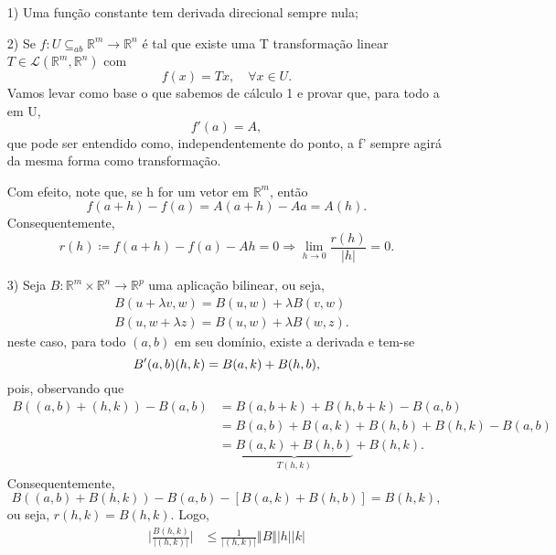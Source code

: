 \documentclass[../analysisII_notes.tex]{subfiles}
\begin{document}
\begin{example}
	\begin{itemize}
		\item[1)] Uma função constante tem derivada direcional sempre nula;
		\item[2)] Se \(f:U \subseteq_{ab} \mathbb{R}^{m}\rightarrow \mathbb{R}^{n}\) é tal que existe uma T transformação linear \(T\in \mathcal{L}(\mathbb{R}^{m}, \mathbb{R}^{n})\) com
		      \[
			      f(x) = Tx,\quad \forall x\in U.
		      \]
		      Vamos levar como base o que sabemos de cálculo 1 e provar que, para todo a em U,
		      \[
			      f'(a) = A,
		      \]
		      que pode ser entendido como, independentemente do ponto, a f' sempre agirá da mesma forma como transformação.

		      Com efeito, note que, se h for um vetor em \(\mathbb{R}^{m}\), então
		      \[
			      f(a+h) - f(a) = A(a+h) - Aa = A(h).
		      \]
		      Consequentemente,
		      \[
			      r(h)\coloneqq f(a+h) - f(a) - Ah = 0 \Rightarrow \lim_{h\to 0}\frac{r(h)}{|h|} = 0.
		      \]
		\item[3)] Seja \(B:\mathbb{R}^{m}\times \mathbb{R}^{n}\rightarrow \mathbb{R}^{p}\) uma aplicação bilinear, ou seja,
		      \begin{align*}
			       & B(u+\lambda v, w) = B(u, w) + \lambda B (v, w)  \\
			       & B(u, w+\lambda z) = B(u, w) + \lambda B (w, z).
		      \end{align*}
		      neste caso, para todo \((a, b)\) em seu domínio, existe a derivada e tem-se
		      \[
			      B'(a, b)(h, k)\footnotetext{\text{Esse (h, k) age como se fosse o h ao qual estamos aplicando.}} = B(a, k) + B(h, b),
		      \]
		      pois, observando que
		      \begin{align*}
			      B((a, b) + (h, k)) - B(a, b) & = B(a, b+k) + B(h, b+k) - B(a, b)                     \\
			                                   & = B(a, b) + B(a, k) + B(h, b) + B(h, k) - B(a, b)     \\
			                                   & = \underbrace{B(a, k) + B(h, b)}_{T(h, k)} + B(h, k).
		      \end{align*}
		      Consequentemente,
		      \[
			      B((a, b) + B(h, k)) - B(a, b) - [B(a, k) + B(h, b)] = B(h, k),
		      \]
		      ou seja, \(r(h, k) = B(h, k)\). Logo,
		      \begin{align*}
			      \biggl\vert \frac{B(h, k)}{|(h, k)|} \biggr\vert & \leq \frac{1}{|(h, k)|}\Vert B \Vert |h||k|                                                                   \\

\end{align*}
\end{itemize}
\end{example}
\end{document}
